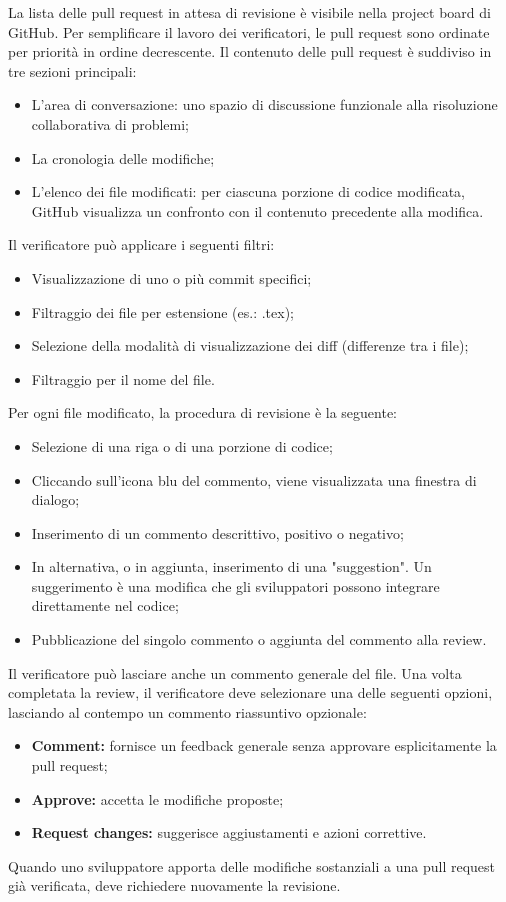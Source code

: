 \par La lista delle pull request in attesa di revisione è visibile nella project board di GitHub. Per semplificare il lavoro dei verificatori, le pull request sono ordinate per priorità in ordine decrescente. Il contenuto delle pull request è suddiviso in tre sezioni principali:
\begin{itemize}
  \item L'area di conversazione: uno spazio di discussione funzionale alla risoluzione collaborativa di problemi;
  \item La cronologia delle modifiche;
  \item L'elenco dei file modificati: per ciascuna porzione di codice modificata, GitHub visualizza un confronto con il contenuto precedente alla modifica.
\end{itemize}
\par Il verificatore può applicare i seguenti filtri:
\begin{itemize}
  \item Visualizzazione di uno o più commit specifici;
  \item Filtraggio dei file per estensione (es.: .tex);
  \item Selezione della modalità di visualizzazione dei diff (differenze tra i file);
  \item Filtraggio per il nome del file.
\end{itemize}
\par Per ogni file modificato, la procedura di revisione è la seguente:
\begin{itemize}
  \item Selezione di una riga o di una porzione di codice;
  \item Cliccando sull'icona blu del commento, viene visualizzata una finestra di dialogo;
  \item Inserimento di un commento descrittivo, positivo o negativo;
  \item In alternativa, o in aggiunta, inserimento di una "suggestion". Un suggerimento è una modifica che gli sviluppatori possono integrare direttamente nel codice;
  \item Pubblicazione del singolo commento o aggiunta del commento alla review. 
\end{itemize}
\par Il verificatore può lasciare anche un commento generale del file. Una volta completata la review, il verificatore deve selezionare una delle seguenti opzioni, lasciando al contempo un commento riassuntivo opzionale:
\begin{itemize}
  \item \textbf{Comment:} fornisce un feedback generale senza approvare esplicitamente la pull request;
  \item \textbf{Approve:} accetta le modifiche proposte;
  \item \textbf{Request changes:} suggerisce aggiustamenti e azioni correttive.
\end{itemize}
\par Quando uno sviluppatore apporta delle modifiche sostanziali a una pull request già verificata, deve richiedere nuovamente la revisione.

